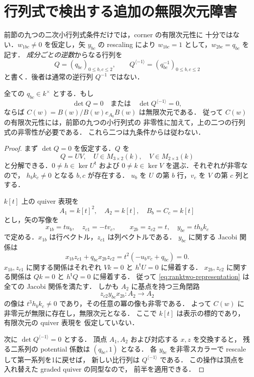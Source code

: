 \section{行列式で検出する追加の無限次元障害}
\label{sec:ranktwo-obstructions}
前節の九つの二次小行列式条件だけでは，corner の有限次元性に
十分ではない．$w_{1bc}\ne0$ を仮定し，矢 $y_{bc}$ の rescaling により
$w_{1bc}=1$ として，$w_{2bc}=q_{bc}$ を記す．
\emph{成分ごとの逆数}からなる行列を
\[
 Q=(q_{bc})_{0\le b,c\le2},\qquad
 Q^{\langle-1\rangle}=(q_{bc}^{-1})_{0\le b,c\le2}
\]
と書く．後者は通常の逆行列 $Q^{-1}$ ではない．

\begin{proposition}[二つの行列式障害]\label{prop:two-determinants}
全ての $q_{bc}\in k^\times$ とする．もし
\[
 \det Q=0\quad\text{または}\quad
 \det Q^{\langle-1\rangle}=0,
\]
ならば $C(w)=B(w)/B(w)e_{A_0}B(w)$ は無限次元である．
従って $C(w)$ の有限次元性には，前節の九つの小行列式の
非零性に加えて，上の二つの行列式の非零性が必要である．
これら二つは九条件からは従わない．
\end{proposition}
\begin{proof}
まず $\det Q=0$ を仮定する．$Q$ を
\[
 Q=UV,\quad U\in M_{3\times2}(k),\quad V\in M_{2\times3}(k)
\]
と分解できる．$0\ne h\in\ker U^{\mathsf t}$ および
$0\ne k\in\ker V$ を選ぶ．それぞれが非零なので，
$h_bk_c\ne0$ となる $b,c$ が存在する．
$u_b$ を $U$ の第 $b$ 行，$v_c$ を $V$ の第 $c$ 列とする．

$k[t]$ 上の quiver 表現を
\[
 A_1=k[t]^2,\quad A_2=k[t],\quad B_b=C_c=k[t]
\]
とし，矢の写像を
\begin{equation}\label{eq:ranktwo-representation}
 x_{1b}=t u_b,\quad z_{c1}=-t v_c,\qquad
 x_{2b}=z_{c2}=t,\quad y_{bc}=t h_bk_c
\end{equation}
で定める．$x_{1b}$ は行ベクトル，$z_{c1}$ は列ベクトルである．
$y_{bc}$ に関する Jacobi 関係は
\[
 x_{1b}z_{c1}+q_{bc}x_{2b}z_{c2}
 =t^2(-u_bv_c+q_{bc})=0.
\]
$x_{1b},z_{c1}$ に関する関係はそれぞれ
$Vk=0$ と $h^{\mathsf t}U=0$ に帰着する．
$x_{2b},z_{c2}$ に関する関係は $Qk=0$ と
$h^{\mathsf t}Q=0$ に帰着する．
従って \eqref{eq:ranktwo-representation} は全ての Jacobi 関係を満たす．
しかも $A_2$ に基点を持つ三角閉路
\[
 z_{c2}y_{bc}x_{2b}:A_2\longrightarrow A_2
\]
の像は $t^3h_bk_c\ne0$ であり，その任意の冪の像も非零である．
よって $C(w)$ に非零元が無限に存在し，無限次元となる．
ここで $k[t]$ は表示の標的であり，有限次元の quiver 表現を
仮定していない．

次に $\det Q^{\langle-1\rangle}=0$ とする．
頂点 $A_1,A_2$ および対応する $x,z$ を交換すると，
残る二系列の potential 係数は $(q_{bc},1)$ となる．
各 $y_{bc}$ を非零スカラーで rescale して第一系列を1に戻せば，
新しい比行列は $Q^{\langle-1\rangle}$ である．
この操作は頂点を入れ替えた graded quiver の同型なので，
前半を適用できる．
\end{proof}

